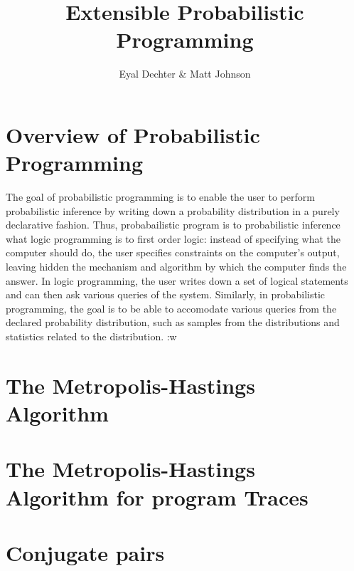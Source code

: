 \documentclass{article}
\title{Extensible Probabilistic Programming}
\author{Eyal Dechter \& Matt Johnson}
\begin{document}
\section{Overview of Probabilistic Programming}
    The goal of probabilistic programming is to enable the user to perform probabilistic inference by writing down a probability distribution in a purely declarative fashion. Thus, probabailistic program is to probabilistic inference what logic programming is to first order logic: instead of specifying what the computer should do, the user specifies constraints on the computer's output, leaving hidden the mechanism and algorithm by which the computer finds the answer. In logic
    programming, the user writes down a set of logical statements and can then ask various queries of the system. Similarly, in probabilistic programming, the goal is to be able to accomodate various queries from the declared probability distribution, such as samples from the distributions and statistics related to the distribution.  
    :w
\section{The Metropolis-Hastings Algorithm}

\section{The Metropolis-Hastings Algorithm for program Traces}

\section{Conjugate pairs}
\end{document}
